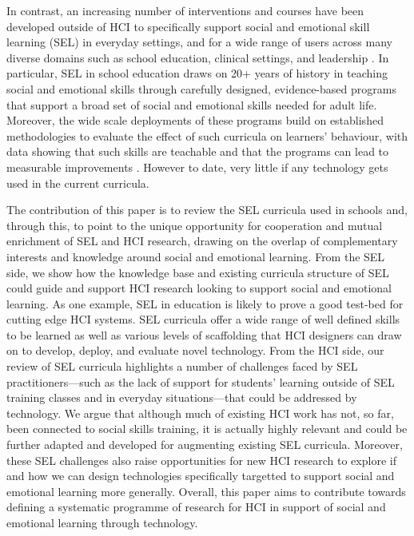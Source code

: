 \documentclass[prodmode,acmtochi]{acmsmall}
\begin{document}
In contrast, an increasing number of interventions and courses have been developed outside of HCI to specifically support social and emotional skill learning (SEL) in everyday settings, and for a wide range of users across many diverse domains such as school education, clinical settings, and leadership \cite{Greenberg2010,Stepien2006,Barth2011,Carey2011,Bono2009}. In particular, SEL in school education draws on 20+ years of history in teaching social and emotional skills through carefully designed, evidence-based programs that support a broad set of social and emotional skills needed for adult life. Moreover, the wide scale deployments of these programs build on established methodologies to evaluate the effect of such curricula on learners' behaviour, with data showing that such skills are teachable and that the programs can lead to measurable improvements \cite{Durlak2011,Weare2011}. However to date, very little if any technology gets used in the current curricula. 

The contribution of this paper is to review the SEL curricula used in schools and, through this, to point to the unique opportunity for cooperation and mutual enrichment of SEL and HCI research, drawing on the overlap of complementary interests and knowledge around social and emotional learning. 
%
From the SEL side, we show how the knowledge base and existing curricula structure of SEL could guide and support HCI research looking to support social and emotional learning. As one example, SEL in education is likely to prove a good test-bed for cutting edge HCI systems. SEL curricula offer a wide range of well defined skills to be learned as well as various levels of scaffolding that HCI designers can draw on to develop, deploy, and evaluate novel technology. 
From the HCI side, our review of SEL curricula highlights a number of challenges faced by SEL practitioners---such as the lack of support for students' learning outside of SEL training classes and in everyday situations---that could be addressed by technology. We argue that although much of existing HCI work has not, so far, been connected to social skills training, it is actually highly relevant and could be further adapted and developed for augmenting existing SEL curricula. Moreover, these SEL challenges also raise opportunities for new HCI research to explore if and how we can design technologies specifically targetted to support social and emotional learning more generally. 
%
Overall, this paper aims to contribute towards defining a systematic programme of research for HCI in support of social and emotional learning through technology. 
\end{document}
